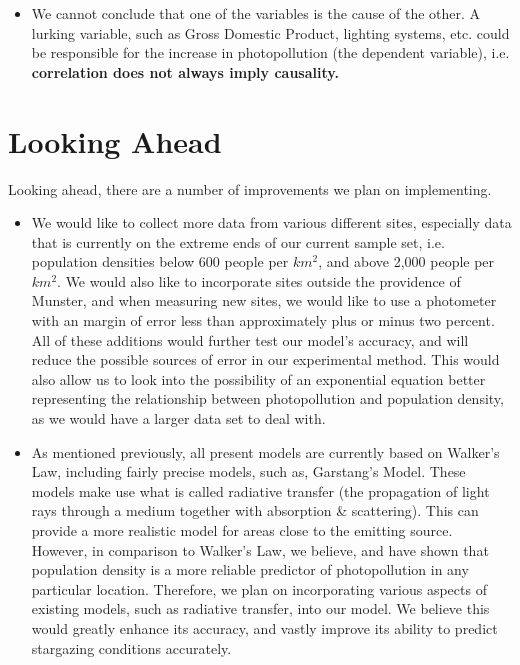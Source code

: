 \begin{itemize}
\item We cannot conclude that one of the variables is the cause of the other. A lurking variable, such as Gross Domestic Product, lighting systems, etc. could be responsible for the increase in photopollution (the dependent variable), i.e. \textbf{correlation does not always imply causality.}\cite{am4}
\end{itemize}

\section{Looking Ahead}
Looking ahead, there are a number of improvements we plan on implementing. 

\begin{itemize}
\item We would like to collect more data from various different sites, especially data that is currently on the extreme ends of our current sample set, i.e. population densities below 600 people per $km^{2}$, and above 2,000 people per $km^{2}$. We would also like to incorporate sites outside the providence of Munster, and when measuring new sites, we would like to use a photometer with an margin of error less than approximately plus or minus two percent. All of these additions would further test our model's accuracy, and will reduce the possible sources of error in our experimental method. This would also allow us to look into the possibility of an exponential equation better representing the relationship between photopollution and population density, as we would have a larger data set to deal with.  
\item As mentioned previously, all present models are currently based on Walker's Law, including fairly precise models, such as, Garstang’s Model.\cite{walkerlaw} These models make use what is called radiative transfer (the propagation of light rays through a medium together with absorption \& scattering). This can provide a more realistic model for areas close to the emitting source. However, in comparison to Walker's Law, we believe, and have shown that population density is a more reliable predictor of photopollution in any particular location. Therefore, we plan on incorporating various aspects of existing models, such as radiative transfer, into our model. We believe this would greatly enhance its accuracy, and vastly improve its ability to predict stargazing conditions accurately. 
\end{itemize}